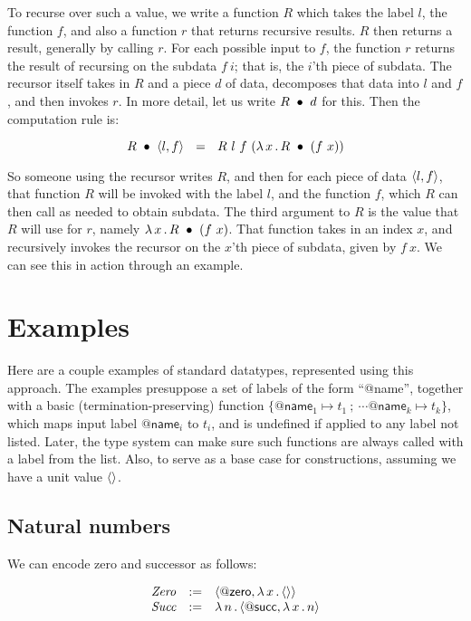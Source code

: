 \documentclass{article}
\begin{document}
To recurse over such a value, we write a function $R$ which takes the
label $l$, the function $f$, and also a function $r$ that returns
recursive results.  $R$ then returns a result, generally by calling
$r$.  For each possible input to $f$, the function $r$ returns the
result of recursing on the subdata $f\ i$; that is, the $i$'th piece
of subdata.  The recursor itself takes in $R$ and a piece $d$ of data,
decomposes that data into $l$ and $f$, and then invokes $r$.  In more
detail, let us write $R\ \bullet\ d$ for this.  Then the computation
rule is:

\[
\wrec{R}{\ctor{l}{f}} \ \ = \ \ R\ l\ f\ (\lam{x}{\wrec{R}{(f\ x)}})
\]

\noindent So someone using the recursor writes $R$, and then for each
piece of data $\langle l , f \rangle$, that function $R$ will be invoked with
the label $l$, and the function $f$, which $R$ can then call as needed
to obtain subdata.  The third argument to $R$ is the value that $R$
will use for $r$, namely $\lambda\, x\, .\, R\ \bullet\ (f\ x)$.  That function
takes in an index $x$, and recursively invokes the recursor on the
$x$'th piece of subdata, given by $f\ x$.  We can see this in action
through an example.

\section{Examples}

Here are a couple examples of standard datatypes, represented using
this approach.  The examples presuppose a set of labels of the form
``\textsf{@name}'', together with a basic (termination-preserving)
function $\{\textsf{@name}_1 \mapsto t_1\ ;\ \cdots \textsf{@name}_k
\mapsto t_k\}$, which maps input label $\textsf{@name}_i$ to $t_i$,
and is undefined if applied to any label not listed.  Later, the type
system can make sure such functions are always called with a label
from the list.  Also, to serve as a base case for constructions,
assuming we have a unit value $\langle\rangle$.

\subsection{Natural numbers}

We can encode zero and successor as follows:

\[
\begin{array}{lll}
  \textit{Zero} & := & \langle \mathsf{@zero} , \lambda\, x\, .\, \langle\rangle \rangle \\
  \textit{Succ} & := & \lambda\, n\, .\, \langle \mathsf{@succ} , \lambda\, x\, .\, n \rangle
\end{array}
\]
\end{document}
